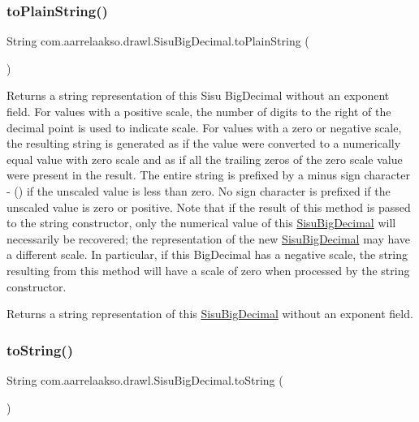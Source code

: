\subsubsection{\texorpdfstring{to\+Plain\+String()}{toPlainString()}}
{\footnotesize\ttfamily String com.\+aarrelaakso.\+drawl.\+Sisu\+Big\+Decimal.\+to\+Plain\+String (\begin{DoxyParamCaption}{ }\end{DoxyParamCaption})\hspace{0.3cm}{\ttfamily [protected]}}

Returns a string representation of this Sisu Big\+Decimal without an exponent field. For values with a positive scale, the number of digits to the right of the decimal point is used to indicate scale. For values with a zero or negative scale, the resulting string is generated as if the value were converted to a numerically equal value with zero scale and as if all the trailing zeros of the zero scale value were present in the result. The entire string is prefixed by a minus sign character \textquotesingle{}-\/\textquotesingle{} (\textquotesingle{}\textquotesingle{}) if the unscaled value is less than zero. No sign character is prefixed if the unscaled value is zero or positive. Note that if the result of this method is passed to the string constructor, only the numerical value of this \hyperlink{classcom_1_1aarrelaakso_1_1drawl_1_1_sisu_big_decimal}{Sisu\+Big\+Decimal} will necessarily be recovered; the representation of the new \hyperlink{classcom_1_1aarrelaakso_1_1drawl_1_1_sisu_big_decimal}{Sisu\+Big\+Decimal} may have a different scale. In particular, if this Big\+Decimal has a negative scale, the string resulting from this method will have a scale of zero when processed by the string constructor.

\begin{DoxyReturn}{Returns}
a string representation of this \hyperlink{classcom_1_1aarrelaakso_1_1drawl_1_1_sisu_big_decimal}{Sisu\+Big\+Decimal} without an exponent field. 
\end{DoxyReturn}
\mbox{\label{classcom_1_1aarrelaakso_1_1drawl_1_1_sisu_big_decimal_ac05b8909bde406486e3fb45e154c5ff4}} 
\subsubsection{\texorpdfstring{to\+String()}{toString()}}
{\footnotesize\ttfamily String com.\+aarrelaakso.\+drawl.\+Sisu\+Big\+Decimal.\+to\+String (\begin{DoxyParamCaption}{ }\end{DoxyParamCaption})}


